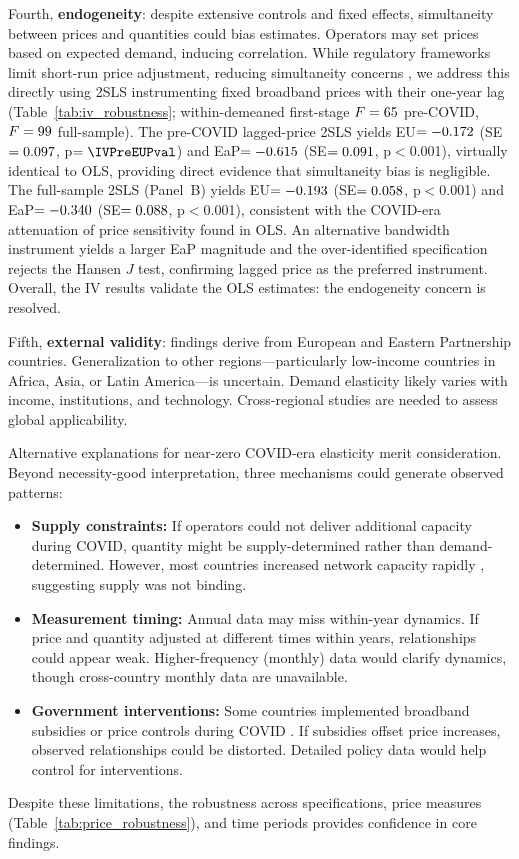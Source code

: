 Fourth, \textbf{endogeneity}: despite extensive controls and fixed effects, simultaneity
between prices and quantities could bias estimates. Operators may set prices based on
expected demand, inducing correlation. While regulatory frameworks limit short-run price
adjustment, reducing simultaneity concerns \citep{laffont2000competition}, we address this
directly using 2SLS instrumenting fixed broadband prices with their one-year lag
(Table~\ref{tab:iv_robustness}; within-demeaned first-stage $F = 65$ pre-COVID,
$F = 99$ full-sample). The pre-COVID lagged-price 2SLS yields EU$=-0.172$
(SE$=0.097$, p$=\IVPreEUPval$) and EaP$=-0.615$ (SE$=0.091$, p$<$0.001),
virtually identical to OLS, providing direct evidence that simultaneity bias is negligible.
The full-sample 2SLS (Panel~B) yields EU$=-0.193$ (SE$=0.058$, p$<$0.001)
and EaP$=-0.340$ (SE$=0.088$, p$<$0.001), consistent with the COVID-era
attenuation of price sensitivity found in OLS. An alternative bandwidth instrument yields
a larger EaP magnitude and the over-identified specification rejects the Hansen $J$ test,
confirming lagged price as the preferred instrument. Overall, the IV results validate
the OLS estimates: the endogeneity concern is resolved.

Fifth, \textbf{external validity}: findings derive from European and Eastern Partnership countries. Generalization to other regions---particularly low-income countries in Africa, Asia, or Latin America---is uncertain. Demand elasticity likely varies with income, institutions, and technology. Cross-regional studies are needed to assess global applicability.

Alternative explanations for near-zero COVID-era elasticity merit consideration. Beyond necessity-good interpretation, three mechanisms could generate observed patterns:

\begin{itemize}
    \item \textbf{Supply constraints:} If operators could not deliver additional capacity during COVID, quantity might be supply-determined rather than demand-determined. However, most countries increased network capacity rapidly \citep{oecd2021broadband}, suggesting supply was not binding.
    
    \item \textbf{Measurement timing:} Annual data may miss within-year dynamics. If price and quantity adjusted at different times within years, relationships could appear weak. Higher-frequency (monthly) data would clarify dynamics, though cross-country monthly data are unavailable.
    
    \item \textbf{Government interventions:} Some countries implemented broadband subsidies or price controls during COVID \citep{oecd2021broadband}. If subsidies offset price increases, observed relationships could be distorted. Detailed policy data would help control for interventions.
\end{itemize}

Despite these limitations, the robustness across specifications, price measures (Table~\ref{tab:price_robustness}), and time periods provides confidence in core findings.
